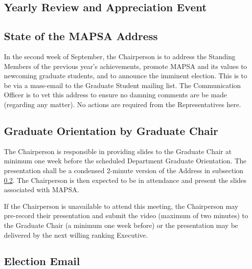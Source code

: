 \documentclass[8pt]{article}
\begin{document}
	\subsection{Yearly Review and Appreciation Event}\label{subsec:app}


	\subsection{State of the MAPSA Address}\label{subsec:stateOfTheMAPSA}
	In the second week of September, the Chairperson is to address the Standing Members of the previous year's achievements, promote MAPSA and its values to newcoming graduate students, and to announce the imminent election. This is to be via a mass-email to the Graduate Student mailing list. The Communication Officer is to vet this address to ensure no damning comments are be made (regarding any matter). No actions are required from the Representatives here.
	
	\subsection{Graduate Orientation by Graduate Chair}\label{subsec:orient}
	The Chairperson is responsible in providing slides to the Graduate Chair at minimum one week before the scheduled Department Graduate Orientation. The presentation shall be a condensed 2-minute version of the Address in subsection \ref{subsec:stateOfTheMAPSA}. The Chairperson is then expected to be in attendance and present the slides associated with MAPSA.
	
	If the Chairperson is unavailable to attend this meeting, the Chairperson may pre-record their presentation and submit the video (maximum of two minutes) to the Graduate Chair (a minimum one week before) or the presentation may be delivered by the next willing ranking Executive. 
	
	\subsection{Election Email}\label{subsec:electionEmail}
	
	
\end{document}
